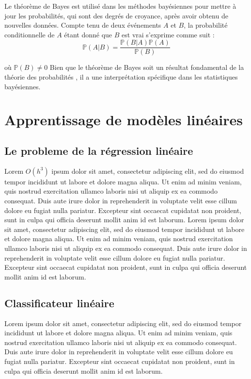 		
		
		\begin{thm} Le théorème de Bayes est utilisé dans les méthodes bayésiennes pour mettre à jour les probabilités, qui sont des degrés de croyance, après avoir obtenu de nouvelles données. Compte tenu de deux événements $A$  et $B$, la probabilité conditionnelle de $A$ étant donné que $B$ est vrai s'exprime comme suit  :
			\begin{equation}
				\mathbb{P}(A|B) = \frac{\mathbb{P}(B|A) \mathbb{P}(A)}{\mathbb{P}(B)}
			\end{equation}
			
		\end{thm}
	
		où $\mathbb{P}(B) \ne 0$ Bien que le théorème de Bayes soit un résultat fondamental de la théorie des probabilités , il a une interprétation spécifique dans les statistiques bayésiennes.
		
		
		
		
	\section{Apprentissage de modèles linéaires}
	\subsection{Le probleme de la régression linéaire}
		Lorem $O(h^3)$ ipsum dolor sit amet, consectetur adipiscing elit, sed do eiusmod tempor incididunt ut labore et dolore magna aliqua. Ut enim ad minim veniam, quis nostrud exercitation ullamco laboris nisi ut aliquip ex ea commodo consequat. Duis aute irure dolor in reprehenderit in voluptate velit esse cillum dolore eu fugiat nulla pariatur. Excepteur sint occaecat cupidatat non proident, sunt in culpa qui officia deserunt mollit anim id est laborum.
		Lorem ipsum dolor sit amet, consectetur adipiscing elit, sed do eiusmod tempor incididunt ut labore et dolore magna aliqua. Ut enim ad minim veniam, quis nostrud exercitation ullamco laboris nisi ut aliquip ex ea commodo consequat. Duis aute irure dolor in reprehenderit in voluptate velit esse cillum dolore eu fugiat nulla pariatur. Excepteur sint occaecat cupidatat non proident, sunt in culpa qui officia deserunt mollit anim id est laborum.
	\subsection{Classificateur linéaire}
		Lorem ipsum dolor sit amet, consectetur adipiscing elit, sed do eiusmod tempor incididunt ut labore et dolore magna aliqua. Ut enim ad minim veniam, quis nostrud exercitation ullamco laboris nisi ut aliquip ex ea commodo consequat. Duis aute irure dolor in reprehenderit in voluptate velit esse cillum dolore eu fugiat nulla pariatur. Excepteur sint occaecat cupidatat non proident, sunt in culpa qui officia deserunt mollit anim id est laborum.
		

